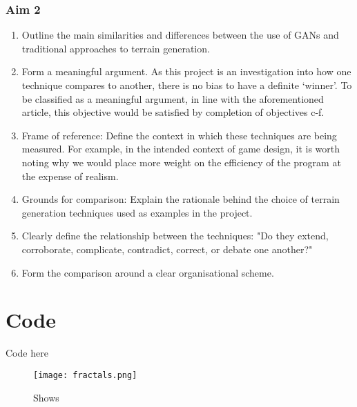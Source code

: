 \documentclass[a4paper]{report}
\begin{document}
\begin{appendices}
\subsubsection{Aim 2}
\begin{enumerate}
    \renewcommand{\theenumi}{\alph{enumi}}
    \item Outline the main similarities and differences between the use of GANs and traditional approaches to terrain generation.
    \item Form a meaningful argument. As this project is an investigation into how one technique compares to another, there is no bias to have a definite `winner'. To be classified as a meaningful argument, in line with the aforementioned article, this objective would be satisfied by completion of objectives c-f.
    \item Frame of reference: Define the context in which these techniques are being measured. For example, in the intended context of game design, it is worth noting why we would place more weight on the efficiency of the program at the expense of realism.
    \item Grounds for comparison: Explain the rationale behind the choice of terrain generation techniques used as examples in the project.
    \item Clearly define the relationship between the techniques: "Do they extend, corroborate, complicate, contradict, correct, or debate one another?" \cite{Walk:1998}
    \item Form the comparison around a clear organisational scheme.
    \end{enumerate}
\section{Code}
Code here

\begin{figure}[H]
    \centering
        \texttt{[image: fractals.png]}
        \caption{Shows }
        \label{fig:ToDo}
\end{figure}
\end{appendices}
\end{document}
